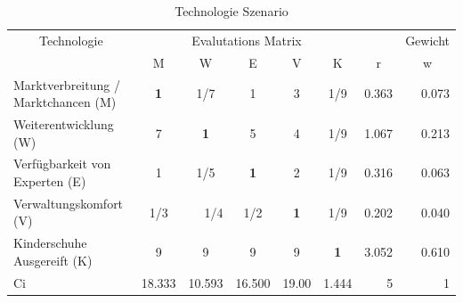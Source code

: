 \begin{table}[htbp]
\caption{Technologie Szenario}
\begin{tabular}{|p{3.9cm}|c|c|c|c|c|r|r|}
\hline
\multicolumn{ 1}{|c|}{Technologie} & \multicolumn{ 5}{c|}{Evalutations Matrix} & \multicolumn{1}{l|}{} & \multicolumn{1}{l|}{Gewicht} \\ \cline{ 2- 8}
\multicolumn{ 1}{|c|}{} & M & W & E & V & K & \multicolumn{1}{c|}{r} & \multicolumn{1}{c|}{w} \\ \hline
Marktverbreitung / Marktchancen (M) & \textbf{1} &  1/7 & 1 & 3 &  1/9 & 0.363 & 0.073 \\ \hline
Weiterentwicklung (W) & 7 & \textbf{1} & 5 & 4 &  1/9 & 1.067 & 0.213 \\ \hline
Verfügbarkeit von Experten (E) & 1 &  1/5 & \textbf{1} & 2 &  1/9 & 0.316 & 0.063 \\ \hline
Verwaltungskomfort (V) &  1/3 & \multicolumn{1}{r|}{ 1/4} &  1/2 & \textbf{1} &  1/9 & 0.202 & 0.040 \\ \hline
Kinderschuhe Ausgereift (K) & 9 & 9 & 9 & 9 & \textbf{1} & 3.052 & 0.610 \\ \hline  \hline
Ci & \multicolumn{1}{r|}{18.333} & \multicolumn{1}{r|}{10.593} & \multicolumn{1}{r|}{16.500} & \multicolumn{1}{r|}{19.00} & \multicolumn{1}{r|}{1.444} & 5 & 1 \\ \hline
\end{tabular}
\label{AHPTechnologieS}
\end{table}


